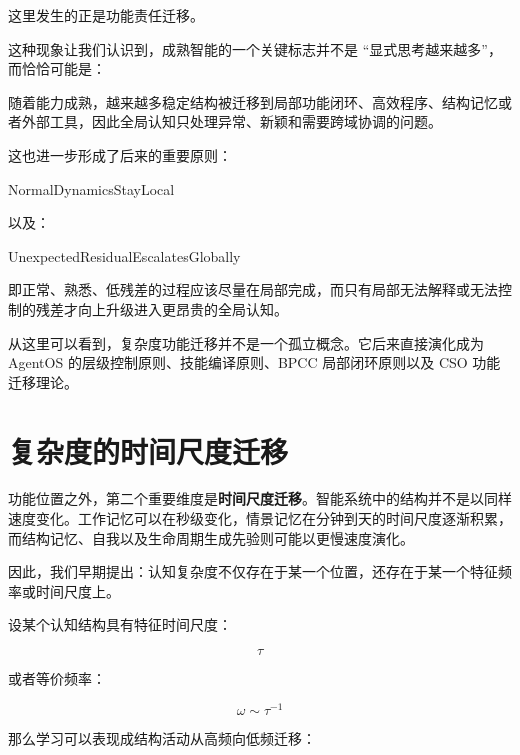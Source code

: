 这里发生的正是功能责任迁移。

这种现象让我们认识到，成熟智能的一个关键标志并不是 ``显式思考越来越多''，而恰恰可能是：

\begin{statementbox}
\centering
{}
\end{statementbox}

随着能力成熟，越来越多稳定结构被迁移到局部功能闭环、高效程序、结构记忆或者外部工具，因此全局认知只处理异常、新颖和需要跨域协调的问题。

这也进一步形成了后来的重要原则：

\begin{statementbox}
NormalDynamicsStayLocal
\end{statementbox}

以及：

\begin{statementbox}
UnexpectedResidualEscalatesGlobally
\end{statementbox}

即正常、熟悉、低残差的过程应该尽量在局部完成，而只有局部无法解释或无法控制的残差才向上升级进入更昂贵的全局认知。

从这里可以看到，复杂度功能迁移并不是一个孤立概念。它后来直接演化成为 AgentOS 的层级控制原则、技能编译原则、BPCC 局部闭环原则以及 CSO 功能迁移理论。

\section{复杂度的时间尺度迁移}
\label{sec:timescale-complexity-migration}

功能位置之外，第二个重要维度是\textbf{时间尺度迁移}。智能系统中的结构并不是以同样速度变化。工作记忆可以在秒级变化，情景记忆在分钟到天的时间尺度逐渐积累，而结构记忆、自我以及生命周期生成先验则可能以更慢速度演化。

因此，我们早期提出：认知复杂度不仅存在于某一个位置，还存在于某一个特征频率或时间尺度上。

设某个认知结构具有特征时间尺度：

\[
\tau
\]

或者等价频率：

\[
\omega
\sim
\tau^{-1}
\]

那么学习可以表现成结构活动从高频向低频迁移：

\begin{statementbox}
\centering
{}
\end{statementbox}

